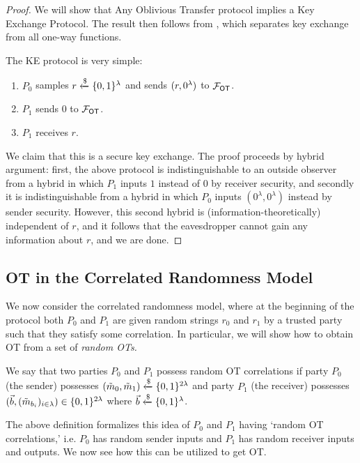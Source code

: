 \begin{proof}
	We will show that Any Oblivious Transfer protocol implies a Key Exchange Protocol.  The result then follows from \cite{impagliazzo1989limits}, which separates key exchange from all one-way functions.
	
	The KE protocol is very simple:
	\begin{enumerate}
		\item $P_0$ samples $r\xleftarrow{\$}\{0,1\}^\lambda$ and sends $(r, 0^\lambda)$ to $\mathcal{F}_\mathsf{OT}$.
		\item $P_1$ sends $0$ to $\mathcal{F}_\mathsf{OT}$.
		\item $P_1$ receives $r$.
	\end{enumerate}

	We claim that this is a secure key exchange. The proof proceeds by hybrid argument: first, the above protocol is indistinguishable to an outside observer from a hybrid in which $P_1$ inputs $1$ instead of $0$ by receiver security, and secondly it is indistinguishable from a hybrid in which $P_0$ inputs $(0^\lambda,0^\lambda)$ instead by sender security. However, this second hybrid is (information-theoretically) independent of $r$, and it follows that the eavesdropper cannot gain any information about $r$, and we are done.
\end{proof}

\subsection{OT in the Correlated Randomness Model}

We now consider the correlated randomness model, where at the beginning of the protocol both $P_0$ and $P_1$ are given random strings $r_0$ and $r_1$ by a trusted party such that they satisfy some correlation. In particular, we will show how to obtain OT from a set of \textit{random OTs.}

\begin{definition}
	We \rarrow say that two parties $P_0$ and $P_1$ possess random OT correlations if party $P_0$ (the sender) possesses $(\tilde{m}_0, \tilde{m}_1)\xleftarrow{\$}\{0,1\}^{2\lambda}$ and party $P_1$ (the receiver) possesses $(\vec{b},(\tilde{m}_{b_i})_{i\in\lambda})\in\{0,1\}^{2\lambda}$ where $\vec{b}\xleftarrow{\$}\{0,1\}^\lambda$.
\end{definition}

The above definition formalizes this idea of $P_0$ and $P_1$ having `random OT correlations,' i.e. $P_0$ has random sender inputs and $P_1$ has random receiver inputs and outputs. We now see how this can be utilized to get OT.

